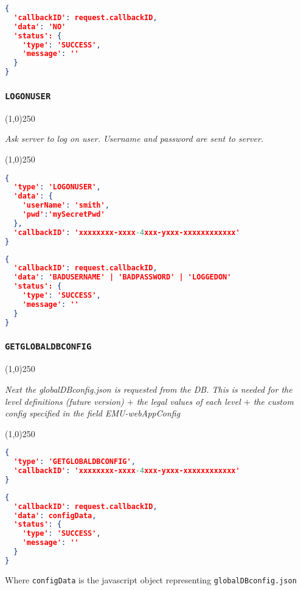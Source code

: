\documentclass[A4,12pt, utf8]{article}
\begin{document}
\begin{lstlisting}[caption=Reply content, language=json]
{
  'callbackID': request.callbackID,
  'data': 'NO'
  'status': {
    'type': 'SUCCESS',
    'message': ''
  }
}
\end{lstlisting}

\subsubsection{\texttt{LOGONUSER}}
\begin{center}
  \line(1,0){250}

  \textit{Ask server to log on user. Username and password are sent to server.}

  \line(1,0){250}
\end{center}

\begin{lstlisting}[caption=Request content, language=json]
{
  'type': 'LOGONUSER',
  'data': {
    'userName': 'smith', 
    'pwd':'mySecretPwd'
  },
  'callbackID': 'xxxxxxxx-xxxx-4xxx-yxxx-xxxxxxxxxxxx'
}
\end{lstlisting}

\begin{lstlisting}[caption=Reply content, language=json]
{
  'callbackID': request.callbackID,
  'data': 'BADUSERNAME' | 'BADPASSWORD' | 'LOGGEDON'
  'status': {
    'type': 'SUCCESS',
    'message': ''
  }
}
\end{lstlisting}

\subsubsection{\texttt{GETGLOBALDBCONFIG}}
\begin{center}
  \line(1,0){250}

  \textit{Next the globalDBconfig.json is requested from the DB. This is needed for the level definitions (future version) $+$ the legal values of each level $+$ the custom config specified in the field EMU-webAppConfig}

  \line(1,0){250}
\end{center}


\begin{lstlisting}[caption=Request content, language=json]
{
  'type': 'GETGLOBALDBCONFIG', 
  'callbackID': 'xxxxxxxx-xxxx-4xxx-yxxx-xxxxxxxxxxxx'
}
\end{lstlisting}

\begin{lstlisting}[caption=Reply content, language=json]
{
  'callbackID': request.callbackID,
  'data': configData,
  'status': {
    'type': 'SUCCESS',
    'message': ''
  }
}
\end{lstlisting}
Where \texttt{configData} is the javascript object representing \texttt{globalDBconfig.json}
\end{document}
